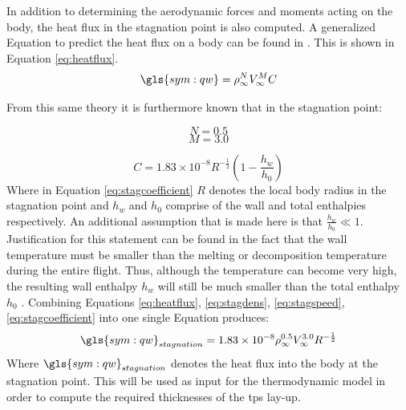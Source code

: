 In addition to determining the aerodynamic forces and moments acting on the body, the heat flux in the stagnation point is also computed. A generalized Equation to predict the heat flux on a body can be found in \cite{AndersonJr.2006,Tauber1986}. This  is shown in Equation \ref{eq:heatflux}.
\begin{equation}
\gls{sym:qw}=\rho_{\infty}^{N}V_{\infty}^{M}C
\label{eq:heatflux}
\end{equation}

From this same theory it is furthermore known that in the stagnation point: 
\begin{multicols}{2}
\begin{equation}
\label{eq:stagdens}
N=0.5
\end{equation} \break
\begin{equation}
\label{eq:stagspeed}
M=3.0
\end{equation}
\end{multicols}
\begin{equation}
\label{eq:stagcoefficient}
C=1.83 \times 10^{-8} R^{-\frac{1}{2}}\left(1-\frac{h_{w}}{h_{0}}\right)
\end{equation}
Where in Equation \ref{eq:stagcoefficient} $R$ denotes the local body radius in the stagnation point and $h_{w}$ and $h_{0}$ comprise of the wall and total enthalpies respectively. An additional assumption that is made here is that $\frac{h_{w}}{h_{0}}\ll 1$. Justification for this statement can be found in the fact that the wall temperature must be smaller than the melting or decomposition temperature during the entire flight. Thus, although the temperature can become very high, the resulting wall enthalpy $h_{w}$ will still be much smaller than the total enthalpy $h_{0}$ \cite[p.347]{AndersonJr.2006}. %
Combining Equations \ref{eq:heatflux}, \ref{eq:stagdens}, \ref{eq:stagspeed}, \ref{eq:stagcoefficient} into one single Equation produces:
\begin{equation}
\gls{sym:qw}_{stagnation}=1.83 \times 10^{-8}\rho_{\infty}^{0.5} V_{\infty}^{3.0} R^{-\frac{1}{2}}
\label{eq:qstag}
\end{equation}
Where $\gls{sym:qw}_{stagnation}$ denotes the heat flux into the body at the stagnation point. This will be used as input for the thermodynamic model in order to compute the required thicknesses of the \acrfull{tps} lay-up.


